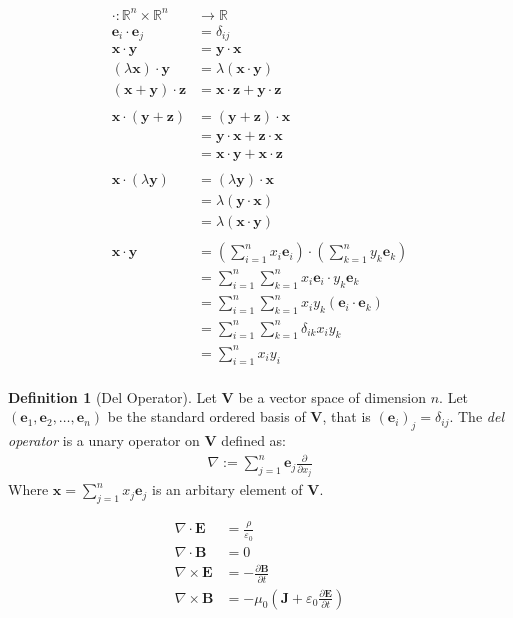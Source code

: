 \documentclass[a4paper,11pt]{article}
\theoremstyle{plain}
\theoremstyle{definition}
\newtheorem{definition}[theorem]{Definition}
\newcommand{\R}{\mathbb{R}}
\newcommand{\del}{\partial}
\begin{document}
\begin{align*}
	\cdot:\R^n\times\R^n&\to\R\\
	\mathbf{e}_i\cdot \mathbf{e}_j &= {\delta}_{ij} \\
	\mathbf{x}\cdot\mathbf{y} &= \mathbf{y}\cdot\mathbf{x} \\
	(\lambda\mathbf{x})\cdot\mathbf{y} &= \lambda(\mathbf{x}\cdot\mathbf{y})\\
	(\mathbf{x}+\mathbf{y})\cdot\mathbf{z} &=
	\mathbf{x}\cdot\mathbf{z}+\mathbf{y}\cdot\mathbf{z}\\
	\\
	\mathbf{x}\cdot(\mathbf{y}+\mathbf{z})
	&=(\mathbf{y}+\mathbf{z})\cdot\mathbf{x} \\
	&=\mathbf{y}\cdot\mathbf{x}+\mathbf{z}\cdot\mathbf{x} \\
	&=\mathbf{x}\cdot\mathbf{y}+\mathbf{x}\cdot\mathbf{z} \\
	\\
	\mathbf{x}\cdot(\lambda\mathbf{y})
	&= (\lambda\mathbf{y})\cdot\mathbf{x} \\
	&= \lambda(\mathbf{y}\cdot\mathbf{x}) \\
	&= \lambda(\mathbf{x}\cdot\mathbf{y}) \\
	\\
	\mathbf{x}\cdot\mathbf{y} 
	&= \left(\sum_{i=1}^n x_i\mathbf{e}_i\right)\cdot
	\left(\sum_{k=1}^n y_k\mathbf{e}_k\right) \\
	&= \sum_{i=1}^n \sum_{k=1}^n x_i\mathbf{e}_i\cdot y_k\mathbf{e}_k \\
	&= \sum_{i=1}^n \sum_{k=1}^n x_i y_k (\mathbf{e}_i\cdot \mathbf{e}_k) \\
	&= \sum_{i=1}^n \sum_{k=1}^n {\delta}_{ik} x_i {y}_{k}  \\
	&= \sum_{i=1}^n x_i y_i  \\
\end{align*}
\newpage
\begin{definition}[Del Operator]
	Let $\mathbf{V}$ be a vector space of dimension $n$. Let
	$(\mathbf{e}_1,\mathbf{e}_2,\dots,\mathbf{e}_n)$ be the standard ordered
	basis of $\mathbf{V}$, that is $(\mathbf{e}_i)_j = \delta_{ij}$. The
	\textit{del operator} is a unary operator on $\mathbf{V}$ defined as:
	\begin{align*}
		\nabla := \sum_{j=1}^{n} \mathbf{e}_j \frac{\del }{\del x_j}
	\end{align*}
	Where $\mathbf{x} = \sum_{j=1}^{n} x_j\mathbf{e}_j$ is an arbitary
	element of $\mathbf{V}$.
\end{definition}
\begin{align*}
	\nabla\cdot\mathbf{E} &= \frac{\rho}{\varepsilon_0} \\
	\nabla\cdot\mathbf{B} &= 0 \\
	\nabla\times\mathbf{E} &= -\frac{\del\mathbf{B}}{\del t} \\
	\nabla\times\mathbf{B} &= -\mu_0\left(\mathbf{J}+\varepsilon_0\frac{\del
	\mathbf{E}}{\del t}\right) \\
\end{align*}
\end{document}
